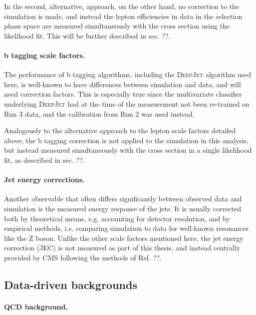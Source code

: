 In the second, alternative, approach, on the other hand, no correction to the simulation is made, and instead the lepton efficiencies in data in the selection phase space are measured simultaneously with the cross section using the likelihood fit. This will be further described in sec. ??.

\paragraph{b tagging scale factors.}

The performance of b tagging algorithms, including the \textsc{DeepJet} algorithm used here, is well-known to have differences between simulation and data, and will need correction factors. This is especially true since the multivariate classifier underlying \textsc{DeepJet} had at the time of the measurement not been re-trained on Run 3 data, and the calibration from Run 2 was used instead.

Analogously to the alternative approach to the lepton scale factors detailed above, the b tagging correction is not applied to the simulation in this analysis, but instead measured simultaneously with the \ttbar cross section in a single likelihood fit, as described in sec. ??.

\paragraph{Jet energy corrections.}

Another observable that often differs significantly between observed data and simulation is the measured energy response of the jets. It is usually corrected both by theoretical means, e.g. accounting for detector resolution, and by empirical methods, i.e. comparing simulation to data for well-known resonances like the Z boson. Unlike the other scale factors mentioned here, the jet energy correction (JEC) is not measured as part of this thesis, and instead centrally provided by CMS following the methods of Ref. ??. 

\subsection{Data-driven backgrounds}
\label{sec:ttxs:datadriven}

\paragraph{QCD background.}

